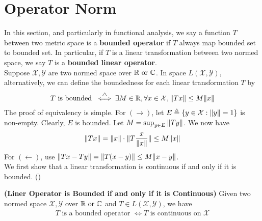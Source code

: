 \documentclass{report}
\begin{document}
\section{Operator Norm}
\begin{mdframed}
In this section, and particularly in functional analysis, we say a function $T$ between two metric space is a  \textbf{bounded operator} if $T$ always map bounded set to bounded set. In particular, if $T$ is a linear transformation between two normed space, we say $T$ is a \textbf{bounded linear operator}.\\

Suppose $\mathcal{X},\mathcal{Y}$ are two normed space over $\mathbb{R}\text{ or }\mathbb{C}$. In space $L(\mathcal{X},\mathcal{Y})$, alternatively, we can define the boundedness for each linear transformation $T$ by 
\begin{align*}
T\text{ is bounded } \overset{\triangle}{\iff} \exists M\in\mathbb{R},\forall x\in \mathcal{X}, \| Tx \|\leq M\| x \|
\end{align*}
The proof of equivalency is simple. For $(\longrightarrow )$, let $E\triangleq \{ y \in \mathcal{X}: \| y \|=1 \}$ is non-empty. Clearly, $E$ is bounded. Let $M=\sup_{y\in E} \| Ty \|$. We now have 
\begin{align*}
\| Tx \|= \| x \|\cdot\| T \frac{x}{\| x \|} \|\leq M\| x \|
\end{align*}
For $(\longleftarrow)$, use $\| Tx-Ty \|=\| T(x-y) \|\leq M\| x-y \|$.\\


We first show that a linear transformation is continuous if and only if it is bounded. () 
\end{mdframed}
\begin{theorem}
\label{LOB}
\textbf{(Liner Operator is Bounded if and only if it is Continuous)} Given two normed space $\mathcal{X},\mathcal{Y}$ over $\mathbb{R}\text{ or }\mathbb{C}$ and  $T\in L(\mathcal{X},\mathcal{Y})$, we have 
\begin{align*}
T\text{ is a bounded operator }\iff T\text{ is continuous on $\mathcal{X}$}
\end{align*}
\end{theorem}
\end{document}
